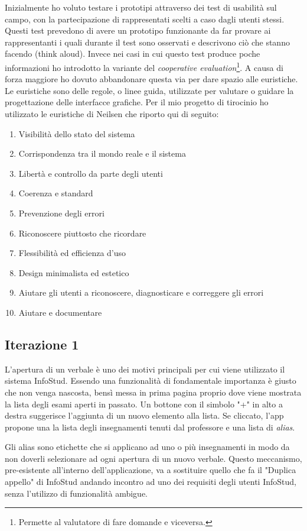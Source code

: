 \documentclass[Lau, oneside]{sapthesis}%
\begin{document}
Inizialmente ho voluto testare i prototipi attraverso dei test di usabilità sul campo, con la partecipazione di rappresentati scelti a caso dagli utenti stessi. Questi test prevedono di avere un prototipo funzionante da far provare ai rappresentanti i quali durante il test sono osservati e descrivono ciò che stanno facendo (think aloud). Invece nei casi in cui questo test produce poche informazioni ho introdotto la variante del \textit{cooperative evaluation}\footnote{Permette al valutatore di fare domande e viceversa.}. A causa di forza maggiore ho dovuto abbandonare questa via per dare spazio alle euristiche. %
Le euristiche sono delle regole, o linee guida, utilizzate per valutare o guidare la progettazione delle interfacce grafiche. Per il mio progetto di tirocinio ho utilizzato le euristiche di Neilsen che riporto qui di seguito:
\begin{enumerate}
	\item Visibilità dello stato del sistema
	\item Corrispondenza tra il mondo reale e il sistema
	\item Libertà e controllo da parte degli utenti
	\item Coerenza e standard
	\item Prevenzione degli errori
	\item Riconoscere piuttosto che ricordare
	\item Flessibilità ed efficienza d’uso 
	\item Design minimalista ed estetico
	\item Aiutare gli utenti a riconoscere, diagnosticare e correggere gli errori
	\item Aiutare e documentare
\end{enumerate}

\subsection{Iterazione 1}
L'apertura di un verbale è uno dei motivi principali per cui viene utilizzato il sistema InfoStud. Essendo una funzionalità di fondamentale importanza è giusto che non venga nascosta, bensì messa in prima pagina proprio dove viene mostrata la lista degli esami aperti in passato. Un bottone con il simbolo "+" in alto a destra suggerisce l'aggiunta di un nuovo elemento alla lista. Se cliccato, l'app propone una la lista degli insegnamenti tenuti dal professore e una lista di \textit{alias}. 

Gli alias sono etichette che si applicano ad uno o più insegnamenti in modo da non doverli selezionare ad ogni apertura di un nuovo verbale. Questo meccanismo, pre-esistente all'interno dell'applicazione, va a sostituire quello che fa il "Duplica appello" di InfoStud andando incontro ad uno dei requisiti degli utenti InfoStud, senza l'utilizzo di funzionalità ambigue.
\end{document}

